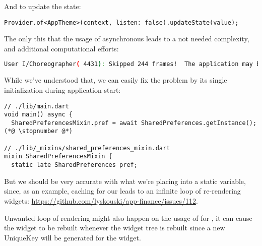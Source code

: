 \noindent And to update the state:

\begin{lstlisting}
Provider.of<AppTheme>(context, listen: false).updateState(value);
\end{lstlisting}

\noindent The only this that the usage of asynchronous  leads to a not needed complexity, and 
additional computational efforts:

\begin{lstlisting}[language=bash]
User I/Choreographer( 4431): Skipped 244 frames!  The application may be doing too much work on its main thread.
\end{lstlisting}

\noindent While we've understood that, we can easily fix the problem by its single initialization during
application start:

\begin{lstlisting}
// ./lib/main.dart
void main() async {
  SharedPreferencesMixin.pref = await SharedPreferences.getInstance();(*@ \stopnumber @*)

// ./lib/_mixins/shared_preferences_mixin.dart
mixin SharedPreferencesMixin {
  static late SharedPreferences pref;
\end{lstlisting}

But we should be very accurate with what we're placing into a static variable, since, as an example, 
caching  for our  leads to an infinite loop of re-rendering widgets:
\href{https://github.com/lyskouski/app-finance/issues/112}{https://github.com/lyskouski/app-finance/issues/112}.

Unwanted loop of rendering might also happen on the usage of  for , it can cause 
the widget to be rebuilt whenever the widget tree is rebuilt since a new UniqueKey will be generated for the widget.
